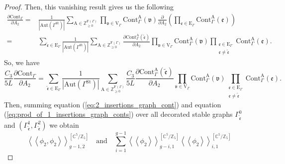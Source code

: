 \documentclass[12pt]{amsart}
\numberwithin{equation}{section}
\begin{document}
\begin{proof}
Then, this vanishing result gives us the following
\begin{equation*}
\begin{aligned}
\frac{\partial \mathrm{Cont}_{\Gamma}}{\partial A_2}
=&\frac{1}{|\mathrm{Aut}(\Gamma^{\mathrm{St}})|} \sum_{\mathrm{A} \in \mathbb{Z}_{\geq 0}^{\mathrm{F}(\Gamma)}} \prod_{\mathfrak{v} \in \mathrm{V}_{\Gamma}} \mathrm{Cont}_{\Gamma}^{\mathrm{A}}(\mathfrak{v})\frac{\partial}{\partial A_2}\left(\prod_{\mathfrak{e}\in \mathrm{E}_{\Gamma}} \mathrm{Cont}_{\Gamma}^{\mathrm{A}}(\mathfrak{e})\right)\\
=&\sum_{\tilde{\mathfrak{e}}\in \mathrm{E}_{\Gamma}}\frac{1}{|\mathrm{Aut}(\Gamma^{\mathrm{St}})|} \sum_{\mathrm{A} \in \mathbb{Z}_{\geq 0}^{\mathrm{F}(\Gamma)}}\frac{\partial \mathrm{Cont}_{\Gamma}^{\mathrm{A}}(\tilde{\mathfrak{e}}) }{\partial A_2} \prod_{\mathfrak{v} \in \mathrm{V}_{\Gamma}} \mathrm{Cont}_{\Gamma}^{\mathrm{A}}(\mathfrak{v})\prod_{\substack{
\mathfrak{e} \in \mathrm{E}_{\Gamma} \\ \mathfrak{e}\neq \tilde{\mathfrak{e}}}} \mathrm{Cont}_{\Gamma}^{\mathrm{A}}(\mathfrak{e}).
\end{aligned}
\end{equation*}
So, we have
\begin{equation}\label{eq:A2_Derivative_of_Gamma_cont}
\frac{C_{3}}{5L}\frac{\partial \mathrm{Cont}_{\Gamma}}{\partial A_2}
=\sum_{\tilde{\mathfrak{e}}\in \mathrm{E}_{\Gamma}}\frac{1}{|\mathrm{Aut}(\Gamma^{\mathrm{St}})|} \sum_{\mathrm{A} \in \mathbb{Z}_{\geq 0}^{\mathrm{F}(\Gamma)}}\frac{C_{3}}{5L}\frac{\partial \mathrm{Cont}_{\Gamma}^{\mathrm{A}}(\tilde{\mathfrak{e}}) }{\partial A_2} \prod_{\mathfrak{v} \in \mathrm{V}_{\Gamma}} \mathrm{Cont}_{\Gamma}^{\mathrm{A}}(\mathfrak{v})\prod_{\substack{
\mathfrak{e} \in \mathrm{E}_{\Gamma} \\ \mathfrak{e}\neq \tilde{\mathfrak{e}}}} \mathrm{Cont}_{\Gamma}^{\mathrm{A}}(\mathfrak{e}).
\end{equation}
Then, summing equation (\ref{eq:2_insertions_graph_cont}) and equation (\ref{eq:prod_of_1_insertions_graph_conts}) over all decorated stable graphs $\Gamma_{\tilde{\mathfrak{e}}}^0$ and $(\Gamma_{\tilde{\mathfrak{e}}}^1,\Gamma_{\tilde{\mathfrak{e}}}^2)$
we obtain
\begin{equation*}
\left\langle\left\langle\phi_{2},\phi_{2}\right\rangle\right\rangle_{g-1,2}^{\left[\mathbb{C}^5 / \mathbb{Z}_5\right]}\quad\text{and}\quad\sum_{i=1}^{g-1}\left\langle\left\langle\phi_{2}\right\rangle\right\rangle_{g-i,1}^{\left[\mathbb{C}^5 / \mathbb{Z}_5\right]}\left\langle\left\langle\phi_{2}\right\rangle\right\rangle_{i,1}^{\left[\mathbb{C}^5 / \mathbb{Z}_5\right]}

\end{equation*}
\end{proof}
\end{document}

